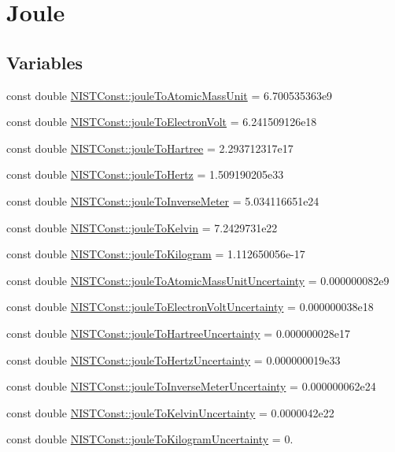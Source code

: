 \hypertarget{group___joule}{}\section{Joule}
\label{group___joule}
\subsection*{Variables}
\begin{DoxyCompactItemize}
\item 
const double \hyperlink{group___joule_ga6a8cba6b834ee62ab61671208b1ae9ee}{N\+I\+S\+T\+Const\+::joule\+To\+Atomic\+Mass\+Unit} = 6.\+700535363e9
\item 
const double \hyperlink{group___joule_ga08ffcdfd701ba898a91b0cbdde4d0e2d}{N\+I\+S\+T\+Const\+::joule\+To\+Electron\+Volt} = 6.\+241509126e18
\item 
const double \hyperlink{group___joule_gac067d2d31bf56c3abe63559dac6c00d7}{N\+I\+S\+T\+Const\+::joule\+To\+Hartree} = 2.\+293712317e17
\item 
const double \hyperlink{group___joule_ga6ac361417bc6b472bf80fcfef276d742}{N\+I\+S\+T\+Const\+::joule\+To\+Hertz} = 1.\+509190205e33
\item 
const double \hyperlink{group___joule_gaa8de9ad07a642c1b9c1d4ee15125a917}{N\+I\+S\+T\+Const\+::joule\+To\+Inverse\+Meter} = 5.\+034116651e24
\item 
const double \hyperlink{group___joule_ga506f23a4b88678bd7ee6f1067e97aa83}{N\+I\+S\+T\+Const\+::joule\+To\+Kelvin} = 7.\+2429731e22
\item 
const double \hyperlink{group___joule_ga250f161277a6e581e695dccb7c11d1fb}{N\+I\+S\+T\+Const\+::joule\+To\+Kilogram} = 1.\+112650056e-\/17
\item 
const double \hyperlink{group___joule_ga0fcd1cd8572c48695fadec809a5a1225}{N\+I\+S\+T\+Const\+::joule\+To\+Atomic\+Mass\+Unit\+Uncertainty} = 0.\+000000082e9
\item 
const double \hyperlink{group___joule_ga36506e3cfb40cd74646e95340c9c4721}{N\+I\+S\+T\+Const\+::joule\+To\+Electron\+Volt\+Uncertainty} = 0.\+000000038e18
\item 
const double \hyperlink{group___joule_ga503d276676014580036110b6554bd974}{N\+I\+S\+T\+Const\+::joule\+To\+Hartree\+Uncertainty} = 0.\+000000028e17
\item 
const double \hyperlink{group___joule_ga059f125fb7eede11c5b14b45349fe18e}{N\+I\+S\+T\+Const\+::joule\+To\+Hertz\+Uncertainty} = 0.\+000000019e33
\item 
const double \hyperlink{group___joule_gaed9939434cab903ad8dbc9d4da1d5e0c}{N\+I\+S\+T\+Const\+::joule\+To\+Inverse\+Meter\+Uncertainty} = 0.\+000000062e24
\item 
const double \hyperlink{group___joule_ga32d9bd2dfbaa6786b317c517b17c2f59}{N\+I\+S\+T\+Const\+::joule\+To\+Kelvin\+Uncertainty} = 0.\+0000042e22
\item 
const double \hyperlink{group___joule_gaf14b109cdaf9892023dc33ceecdc0b9f}{N\+I\+S\+T\+Const\+::joule\+To\+Kilogram\+Uncertainty} = 0.
\end{DoxyCompactItemize}


